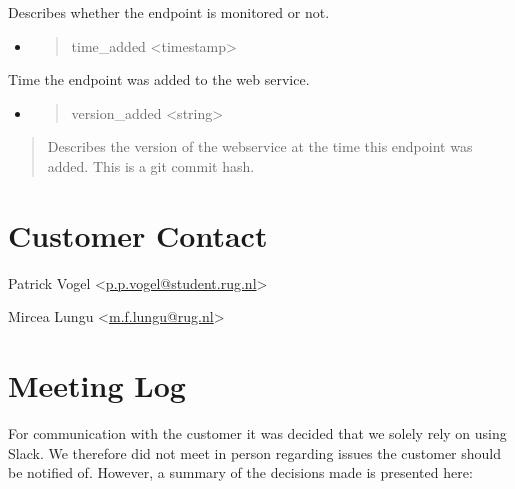 Describes whether the endpoint is monitored or not.

\begin{itemize}
\item
  \begin{quote}
  time\_added \textless{}timestamp\textgreater{}
  \end{quote}
\end{itemize}

Time the endpoint was added to the web service.

\begin{itemize}
\item
  \begin{quote}
  version\_added \textless{}string\textgreater{}
  \end{quote}
\end{itemize}

\begin{quote}
Describes the version of the webservice at the time this endpoint was
added. This is a git commit hash.
\end{quote}

\hypertarget{customer-contact}{%
\section{Customer Contact}\label{customer-contact}}

Patrick Vogel
\textless{}\href{mailto:p.p.vogel@student.rug.nl}{{p.p.vogel@student.rug.nl}}\textgreater{}

Mircea Lungu
\textless{}\href{mailto:m.f.lungu@rug.nl}{{m.f.lungu@rug.nl}}\textgreater{}

\hypertarget{meeting-log}{%
\section{Meeting Log}\label{meeting-log}}

For communication with the customer it was decided that we solely rely
on using Slack. We therefore did not meet in person regarding issues the
customer should be notified of. However, a summary of the decisions made
is presented here:

